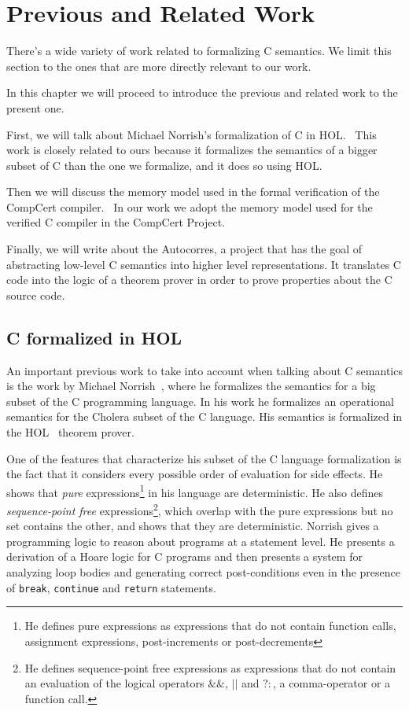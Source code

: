 \chapter{Previous and Related Work}\label{chapter:previous}

There's a wide variety of work related to formalizing C semantics.
We limit this section to the ones that are more directly relevant to our work.

In this chapter we will proceed to introduce the previous and related work to the present one.

First, we will talk about Michael Norrish's formalization of C in HOL.~\parencite{norrish}
This work is closely related to ours because it formalizes the semantics of a bigger subset of C than the one we formalize, and it does so using HOL.

Then we will discuss the memory model used in the formal verification of the CompCert compiler.~\parencite{leroy-blazy-memory-model}
In our work we adopt the memory model used for the verified C compiler in the CompCert Project.

Finally, we will write about the Autocorres, a project that has the goal of abstracting low-level C semantics into higher level representations.
It translates C code into the logic of a theorem prover in order to prove properties about the C source code.

\section{C formalized in HOL}

An important previous work to take into account when talking about C semantics is the work by Michael Norrish~\parencite{norrish}, where he formalizes the semantics for a big subset of the C programming language.
In his work he formalizes an operational semantics for the Cholera subset of the C language.
His semantics is formalized in the HOL~\parencite{hol-doc} theorem prover.

One of the features that characterize his subset of the C language formalization is the fact that it considers every possible order of evaluation for side effects.
He shows that \textit{pure} expressions\footnote{He defines pure expressions as expressions that do not contain function calls, assignment expressions, post-increments or post-decrements} in his language are deterministic.
He also defines \textit{sequence-point free} expressions\footnote{He defines sequence-point free expressions as expressions that do not contain an evaluation of the logical operators $\&\&$, $||$ and $?:$, a comma-operator or a function call.}, which overlap with the pure expressions but no set contains the other, and shows that they are deterministic.
Norrish gives a programming logic to reason about programs at a statement level.
He presents a derivation of a Hoare logic for C programs and then presents a system for analyzing loop bodies and generating correct post-conditions even in the presence of \verb|break|, \verb|continue| and \verb|return| statements.


